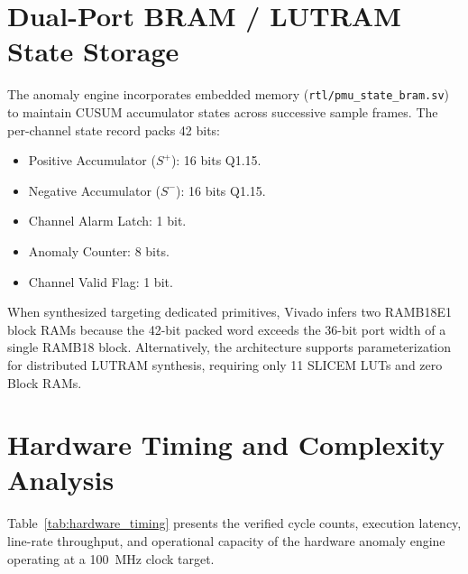 \documentclass[11pt,a4paper]{report}
\begin{document}
\section{Dual-Port BRAM / LUTRAM State Storage}
The anomaly engine incorporates embedded memory (\texttt{rtl/pmu\_state\_bram.sv}) to maintain CUSUM
accumulator states across successive sample frames. The per-channel state record packs 42 bits:
\begin{itemize}
    \item Positive Accumulator ($S^+$): 16 bits Q1.15.
    \item Negative Accumulator ($S^-$): 16 bits Q1.15.
    \item Channel Alarm Latch: 1 bit.
    \item Anomaly Counter: 8 bits.
    \item Channel Valid Flag: 1 bit.
\end{itemize}
When synthesized targeting dedicated primitives, Vivado infers two RAMB18E1 block RAMs because
the 42-bit packed word exceeds the 36-bit port width of a single RAMB18 block. Alternatively,
the architecture supports parameterization for distributed LUTRAM synthesis, requiring only
11 SLICEM LUTs and zero Block RAMs.

\section{Hardware Timing and Complexity Analysis}
Table~\ref{tab:hardware_timing} presents the verified cycle counts, execution latency,
line-rate throughput, and operational capacity of the hardware anomaly engine operating at
a 100~MHz clock target.
\end{document}
